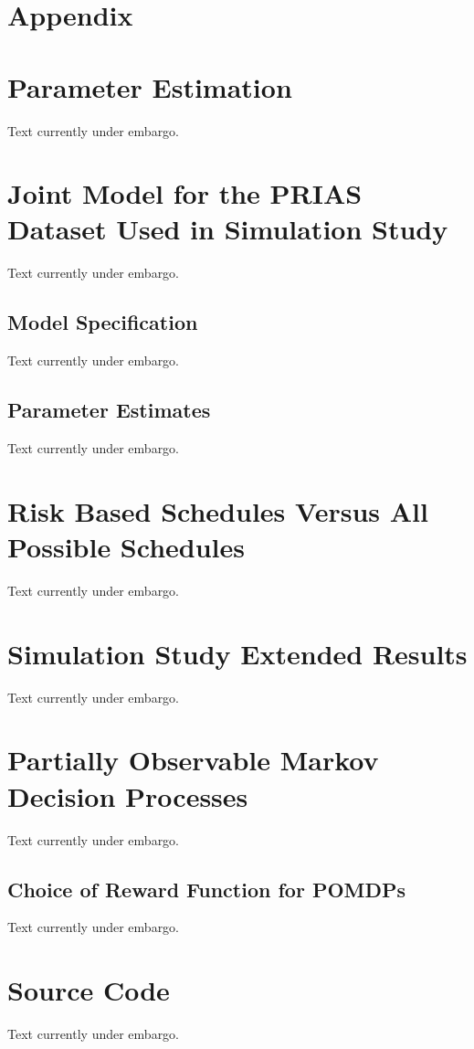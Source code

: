 \section*{Appendix}

\begin{subappendices}
\section{Parameter Estimation}
\label{c4:appendix:param_estimation}
Text currently under embargo.

\section{Joint Model for the PRIAS Dataset Used in Simulation Study}
Text currently under embargo.

\subsection{Model Specification}
Text currently under embargo.

\subsection{Parameter Estimates}
\label{c4:appendix:param_estimates}
Text currently under embargo.

\section{Risk Based Schedules Versus All Possible Schedules}
\label{c4:appendix:all_possible}
Text currently under embargo.

\section{Simulation Study Extended Results}
Text currently under embargo.

\section{Partially Observable Markov Decision Processes}
\label{c4:appendix:pomdp}
Text currently under embargo.

\subsection{Choice of Reward Function for POMDPs}
Text currently under embargo.

\section{Source Code}
\label{c4:appendix:source_code}
Text currently under embargo.

\end{subappendices}